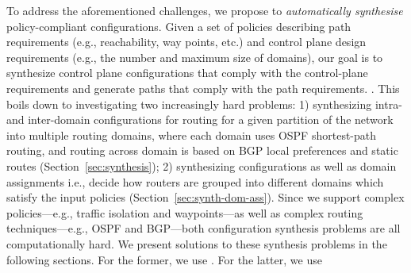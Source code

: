  To address the aforementioned
challenges, we propose to \emph{automatically synthesise}
policy-compliant configurations.  Given a set of policies describing
path requirements (e.g., reachability, way points, etc.)  and control
plane design requirements (e.g., the number and maximum size of
domains), our goal is to synthesize control plane configurations that
comply with the control-plane requirements and generate paths that
comply with the path requirements.  . This boils down to investigating two increasingly
hard problems: 1) synthesizing intra- and inter-domain configurations
for routing for a given partition of the network into multiple routing
domains, where each domain uses OSPF shortest-path routing, and
routing across domain is based on BGP local preferences and static
routes (Section~\ref{sec:synthesis}); 2) synthesizing configurations
as well as domain assignments i.e., decide how routers are grouped
into different domains which satisfy the input policies
(Section~\ref{sec:synth-dom-ass}).  Since we support complex
policies---e.g., traffic isolation and waypoints---as well as complex
routing techniques---e.g., OSPF and BGP---both configuration synthesis
problems are all computationally hard.  We present solutions to these
synthesis problems in the following sections. For the former, we use
. For the latter, we use  







